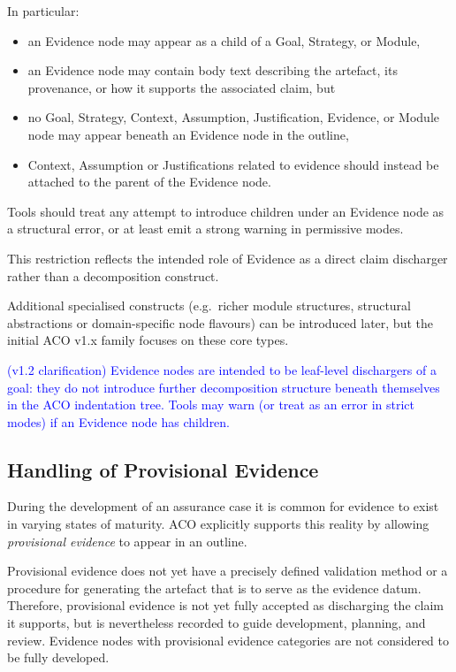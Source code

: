 \documentclass[11pt]{article}
\begin{document}
In particular:
\begin{itemize}[leftmargin=2em]
  \item an Evidence node may appear as a child of a Goal, Strategy, or Module,
  \item an Evidence node may contain body text describing the artefact, its provenance,
        or how it supports the associated claim, but
  \item no Goal, Strategy, Context, Assumption, Justification, Evidence, or Module node
        may appear beneath an Evidence node in the outline,
  \item Context, Assumption or Justifications related to evidence should instead be attached to the parent of the Evidence node.
\end{itemize}

Tools should treat any attempt to introduce children under an Evidence node as a
structural error, or at least emit a strong warning in permissive modes.

This restriction reflects the intended role of Evidence as a direct claim discharger
rather than a decomposition construct.

Additional specialised constructs (e.g.\ richer module structures, structural abstractions or domain-specific node flavours) can be introduced later, but the initial ACO v1.x family focuses on these core types.

\textcolor{blue}{(v1.2 clarification) Evidence nodes are intended to be leaf-level dischargers of a goal: they do not introduce further decomposition structure beneath themselves in the ACO indentation tree. Tools may warn (or treat as an error in strict modes) if an Evidence node has children.}

\subsection{Handling of Provisional Evidence}
\label{sec:provisional-evidence}

During the development of an assurance case it is common for evidence to exist in
varying states of maturity. ACO explicitly supports this reality by allowing
\emph{provisional evidence} to appear in an outline.

Provisional evidence does not yet have a precisely defined validation method or a procedure for generating the artefact that is to serve as the evidence datum.
Therefore, provisional evidence is not yet fully accepted as discharging
the claim it supports, but is nevertheless recorded to guide development,
planning, and review. Evidence nodes with provisional evidence categories are not considered to be fully developed.
\end{document}
